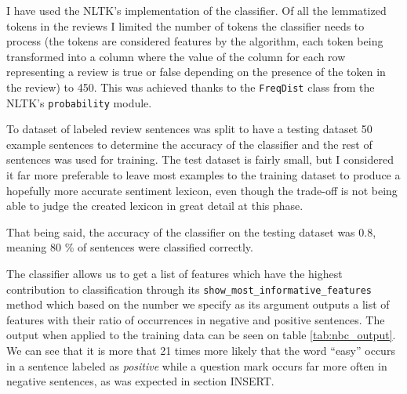 I have used the NLTK's implementation of the classifier. Of all the lemmatized tokens in the reviews I limited the number of tokens the classifier needs to process (the tokens are considered features by the algorithm, each token being transformed into a column where the value of the column for each row representing a review is true or false depending on the presence of the token in the review) to 450. This was achieved thanks to the \texttt{FreqDist} class from the NLTK's \texttt{probability} module.

To dataset of labeled review sentences was split to have a testing dataset 50 example sentences to determine the accuracy of the classifier and the rest of sentences was used for training. The test dataset is fairly small, but I considered it far more preferable to leave most examples to the training dataset to produce a hopefully more accurate sentiment lexicon, even though the trade-off is not being able to judge the created lexicon in great detail at this phase. 

That being said, the accuracy of the classifier on the testing dataset was 0.8, meaning 80 \% of sentences were classified correctly. 

The classifier allows us to get a list of features which have the highest contribution to classification through its \texttt{show\_most\_informative\_features} method which based on the number we specify as its argument outputs a list of features with their ratio of occurrences in negative and positive sentences. The output when applied to the training data can be seen on table \ref{tab:nbc_output}. We can see that it is more that 21 times more likely that the word ``easy'' occurs in a sentence labeled as \textit{positive} while a question mark occurs far more often in negative sentences, as was expected in section INSERT.

